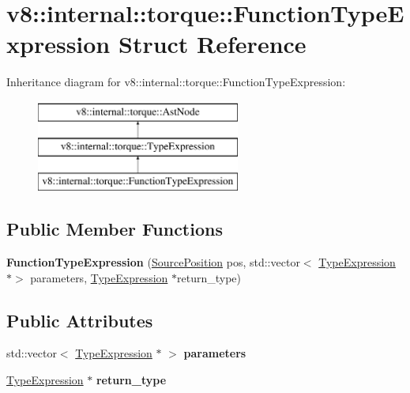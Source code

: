 \hypertarget{structv8_1_1internal_1_1torque_1_1FunctionTypeExpression}{}\section{v8\+:\+:internal\+:\+:torque\+:\+:Function\+Type\+Expression Struct Reference}
\label{structv8_1_1internal_1_1torque_1_1FunctionTypeExpression}
Inheritance diagram for v8\+:\+:internal\+:\+:torque\+:\+:Function\+Type\+Expression\+:\begin{figure}[H]
\begin{center}
\leavevmode
\includegraphics[height=3.000000cm]{structv8_1_1internal_1_1torque_1_1FunctionTypeExpression}
\end{center}
\end{figure}
\subsection*{Public Member Functions}
\begin{DoxyCompactItemize}
\item 
\mbox{\label{structv8_1_1internal_1_1torque_1_1FunctionTypeExpression_ab46db984211e31b7a4362327bbee3102}} 
{\bfseries Function\+Type\+Expression} (\mbox{\hyperlink{structv8_1_1internal_1_1torque_1_1SourcePosition}{Source\+Position}} pos, std\+::vector$<$ \mbox{\hyperlink{structv8_1_1internal_1_1torque_1_1TypeExpression}{Type\+Expression}} $\ast$$>$ parameters, \mbox{\hyperlink{structv8_1_1internal_1_1torque_1_1TypeExpression}{Type\+Expression}} $\ast$return\+\_\+type)
\end{DoxyCompactItemize}
\subsection*{Public Attributes}
\begin{DoxyCompactItemize}
\item 
\mbox{\label{structv8_1_1internal_1_1torque_1_1FunctionTypeExpression_a00c1ec3cf5e60c99f9ef30d9c9b614b0}} 
std\+::vector$<$ \mbox{\hyperlink{structv8_1_1internal_1_1torque_1_1TypeExpression}{Type\+Expression}} $\ast$ $>$ {\bfseries parameters}
\item 
\mbox{\label{structv8_1_1internal_1_1torque_1_1FunctionTypeExpression_a3ca109411c87715afc18bb2b171be076}} 
\mbox{\hyperlink{structv8_1_1internal_1_1torque_1_1TypeExpression}{Type\+Expression}} $\ast$ {\bfseries return\+\_\+type}
\end{DoxyCompactItemize}
